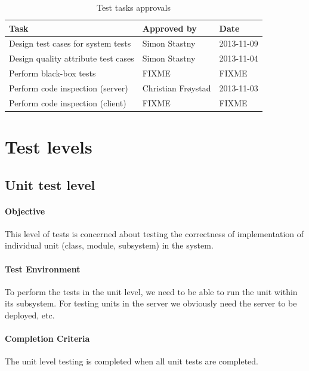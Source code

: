 \documentclass[11pt]{book}
\begin{document}
\begin{table}[H]
    \centering
    \begin{tabular}{| l | l | l |}
        \hline
        Task                                & Approved by             & Date           \\ \hline
        Design test cases for system tests  & Simon Stastny           & 2013-11-09     \\ \hline
        Design quality attribute test cases & Simon Stastny           & 2013-11-04     \\ \hline
        Perform black-box tests             & FIXME                   & FIXME          \\ \hline
        Perform code inspection (server)    & Christian Frøystad      & 2013-11-03     \\ \hline
        Perform code inspection (client)    & FIXME                   & FIXME          \\ \hline
    \end{tabular}
    \caption{Test tasks approvals}
    \label{tab:test_plan_approvals}
\end{table}

\section{Test levels}\label{sec:testlevels}

\subsection{Unit test level}

\paragraph{Objective}
This level of tests is concerned about testing the correctness of implementation of individual unit (class, module, subsystem) in the system.

\paragraph{Test Environment}
To perform the tests in the unit level, we need to be able to run the unit within its subsystem. For testing units in the server we obviously need the server to be deployed, etc.

\paragraph{Completion Criteria}
The unit level testing is completed when all unit tests are completed.
\end{document}
